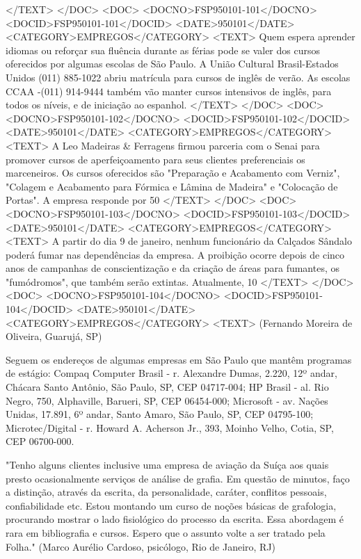 </TEXT>
</DOC>
<DOC>
<DOCNO>FSP950101-101</DOCNO>
<DOCID>FSP950101-101</DOCID>
<DATE>950101</DATE>
<CATEGORY>EMPREGOS</CATEGORY>
<TEXT>
Quem espera aprender idiomas ou reforçar sua fluência durante as férias pode se valer dos cursos oferecidos por algumas escolas de São Paulo. A União Cultural Brasil-Estados Unidos (011) 885-1022 abriu matrícula para cursos de inglês de verão. As escolas CCAA -(011) 914-9444 também vão manter cursos intensivos de inglês, para todos os níveis, e de iniciação ao espanhol. 
</TEXT>
</DOC>
<DOC>
<DOCNO>FSP950101-102</DOCNO>
<DOCID>FSP950101-102</DOCID>
<DATE>950101</DATE>
<CATEGORY>EMPREGOS</CATEGORY>
<TEXT>
A Leo Madeiras & Ferragens firmou parceria com o Senai para promover cursos de aperfeiçoamento para seus clientes preferenciais os marceneiros. Os cursos oferecidos são "Preparação e Acabamento com Verniz", "Colagem e Acabamento para Fórmica e Lâmina de Madeira" e "Colocação de Portas". A empresa responde por 50%
</TEXT>
</DOC>
<DOC>
<DOCNO>FSP950101-103</DOCNO>
<DOCID>FSP950101-103</DOCID>
<DATE>950101</DATE>
<CATEGORY>EMPREGOS</CATEGORY>
<TEXT>
A partir do dia 9 de janeiro, nenhum funcionário da Calçados Sândalo poderá fumar nas dependências da empresa. A proibição ocorre depois de cinco anos de campanhas de conscientização e da criação de áreas para fumantes, os "fumódromos", que também serão extintas. Atualmente, 10%
</TEXT>
</DOC>
<DOC>
<DOCNO>FSP950101-104</DOCNO>
<DOCID>FSP950101-104</DOCID>
<DATE>950101</DATE>
<CATEGORY>EMPREGOS</CATEGORY>
<TEXT>
(Fernando Moreira de Oliveira, Guarujá, SP)

Seguem os endereços de algumas empresas em São Paulo que mantêm programas de estágio:
Compaq Computer Brasil - r. Alexandre Dumas, 2.220, 12º andar, Chácara Santo Antônio, São Paulo, SP, CEP 04717-004;
HP Brasil - al. Rio Negro, 750, Alphaville, Barueri, SP, CEP 06454-000;
Microsoft - av. Nações Unidas, 17.891, 6º andar, Santo Amaro, São Paulo, SP, CEP 04795-100;
Microtec/Digital - r. Howard A. Acherson Jr., 393, Moinho Velho, Cotia, SP, CEP 06700-000.
 
"Tenho alguns clientes inclusive uma empresa de aviação da Suíça aos quais presto ocasionalmente serviços de análise de grafia. Em questão de minutos, faço a distinção, através da escrita, da personalidade, caráter, conflitos pessoais, confiabilidade etc. Estou montando um curso de noções básicas de grafologia, procurando mostrar o lado fisiológico do processo da escrita. Essa abordagem é rara em bibliografia e cursos. Espero que o assunto volte a ser tratado pela Folha." 
(Marco Aurélio Cardoso, psicólogo, Rio de Janeiro, RJ)

